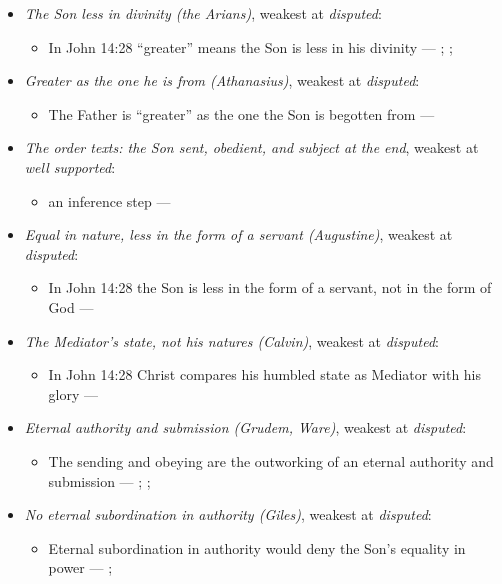 \documentclass[11pt,paper=\testimonypaper,DIV=13,parskip=false]{scrartcl}
\begin{document}
\begin{itemize}
\item \emph{The Son less in divinity (the Arians)}, weakest at \emph{disputed}:
\begin{itemize}
\item In John 14:28 “greater” means the Son is less in his divinity --- \cite[De Synodis 28]{schaff-nicene-post-nicene-fathers-2-4-1892}; \cite[On the Trinity I.7.14]{schaff-nicene-post-nicene-fathers-1-3-1887}; \cite[102]{calvin-commentary-john-2-1847}
\end{itemize}
\item \emph{Greater as the one he is from (Athanasius)}, weakest at \emph{disputed}:
\begin{itemize}
\item The Father is “greater” as the one the Son is begotten from --- \cite[Against the Arians I.13.58]{schaff-nicene-post-nicene-fathers-2-4-1892}
\end{itemize}
\item \emph{The order texts: the Son sent, obedient, and subject at the end}, weakest at \emph{well supported}:
\begin{itemize}
\item an inference step --- \cite[3, The Triune God]{kibbey-living-systematic-theology-2026}
\end{itemize}
\item \emph{Equal in nature, less in the form of a servant (Augustine)}, weakest at \emph{disputed}:
\begin{itemize}
\item In John 14:28 the Son is less in the form of a servant, not in the form of God --- \cite[On the Trinity I.7.14]{schaff-nicene-post-nicene-fathers-1-3-1887}
\end{itemize}
\item \emph{The Mediator’s state, not his natures (Calvin)}, weakest at \emph{disputed}:
\begin{itemize}
\item In John 14:28 Christ compares his humbled state as Mediator with his glory --- \cite[102--103]{calvin-commentary-john-2-1847}
\end{itemize}
\item \emph{Eternal authority and submission (Grudem, Ware)}, weakest at \emph{disputed}:
\begin{itemize}
\item The sending and obeying are the outworking of an eternal authority and submission --- \cite[40]{grudem-doctrinal-deviations-2015}; \cite{grudem-ets-trinity-2016}; \cite{ware-father-son-holy-spirit-2005}
\end{itemize}
\item \emph{No eternal subordination in authority (Giles)}, weakest at \emph{disputed}:
\begin{itemize}
\item Eternal subordination in authority would deny the Son’s equality in power --- \cite[323]{giles-ets-trinity-2008}; \cite{giles-jesus-and-the-father-2006}
\end{itemize}
\end{itemize}
\end{document}
